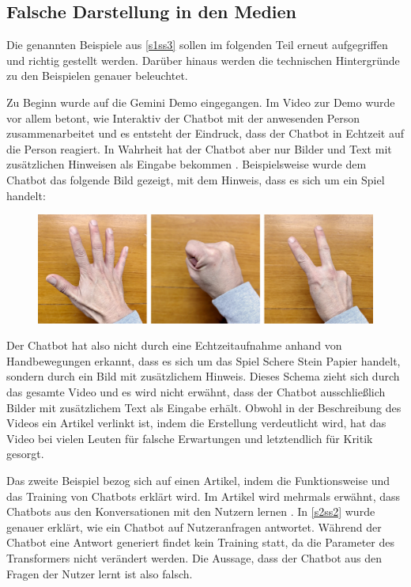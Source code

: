 	\subsection{Falsche Darstellung in den Medien}\label{s3ss2}
	Die genannten Beispiele aus \ref{s1ss3} sollen im folgenden Teil erneut aufgegriffen und richtig gestellt werden. Darüber
	hinaus werden die technischen Hintergründe zu den Beispielen genauer beleuchtet. 

	Zu Beginn wurde auf die Gemini Demo eingegangen. Im Video zur Demo wurde vor allem betont, wie Interaktiv der Chatbot mit
	der anwesenden Person zusammenarbeitet und es entsteht der Eindruck, dass der Chatbot in Echtzeit auf die Person reagiert.
	In Wahrheit hat der Chatbot aber nur Bilder und Text mit zusätzlichen Hinweisen als Eingabe bekommen \cite{chenGoogle23}. Beispielsweise wurde
	dem Chatbot das folgende Bild gezeigt, mit dem Hinweis, dass es sich um ein Spiel handelt:
	\begin{figure}[h]
    	\includegraphics[scale=0.25]{assets/hand_rock_paper_scissors.png}
    \end{figure}
	\newline
	Der Chatbot hat also nicht durch eine Echtzeitaufnahme anhand von Handbewegungen erkannt, dass es sich um das Spiel \glqq{}Schere
	Stein Papier\grqq{} handelt, sondern durch ein Bild mit zusätzlichem Hinweis. Dieses Schema zieht sich durch das gesamte Video und
	es wird nicht erwähnt, dass der Chatbot ausschließlich Bilder mit zusätzlichem Text als Eingabe erhält. Obwohl in der Beschreibung des
	Videos ein Artikel verlinkt ist, indem die Erstellung verdeutlicht wird, hat das Video bei vielen Leuten für falsche
	Erwartungen und letztendlich für Kritik gesorgt.

	Das zweite Beispiel bezog sich auf einen Artikel, indem die Funktionsweise und das Training von Chatbots erklärt wird. Im 
	Artikel wird mehrmals erwähnt, dass Chatbots aus den Konversationen mit den Nutzern lernen \cite{gramsch23}. In \ref{s2ss2} wurde genauer 
	erklärt, wie ein Chatbot auf Nutzeranfragen antwortet. Während der Chatbot eine Antwort generiert findet kein Training statt, da die Parameter
	des Transformers nicht verändert werden. Die Aussage, dass der Chatbot aus den Fragen der Nutzer lernt ist also falsch.	

